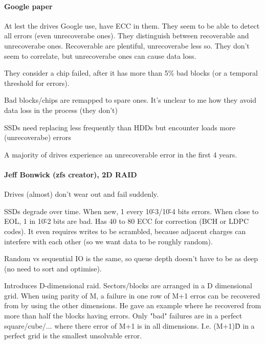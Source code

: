 \documentclass[a4paper]{report}
\begin{document}
        \paragraph{Google paper}
        At lest the drives Google use, have ECC in them. They seem to be able
        to detect all errors (even unrecoverabe ones). They distinguish between
        recoverable and unrecoverabe ones. Recoverable are plentiful,
        unrecoverabe less so. They don't seem to correlate, but unrecoverabe
        ones can cause data loss.

        They consider a chip failed, after it has more than 5\% bad blocks (or
        a temporal threshold for errors).

        Bad blocks/chips are remapped to spare ones. It's unclear to me how
        they avoid data loss in the process (they don't)

        SSDs need replacing less frequently than HDDs but encounter loads more
        (unrecoverabe) errors

        A majority of drives experience an unrecoverable error in the first 4
        years.

        \paragraph{Jeff Bonwick (zfs creator), 2D RAID}
        Drives (almost) don't wear out and fail suddenly.

        SSDs degrade over time. When new, 1 every 10\^-3/10\^-4 bits errors. When
        close to EOL, 1 in 10\^-2 bits are bad. Has 40 to 80 ECC for correction
        (BCH or LDPC codes). It even requires writes to be scrambled, because
        adjacent charges can interfere with each other (so we want data to be
        roughly random).

        Random vs sequential IO is the same, so queue depth doesn't have to be
        as deep (no need to sort and optimise).

        Introduces D-dimensional raid. Sectors/blocks are arranged in a D
        dimensional grid. When using parity of M, a failure in one row of M+1
        erros can be recovered from by using the other dimensions. He gave an
        example where he recovered from more than half the blocks having
        errors. Only "bad" failures are in a perfect square/cube/... where
        there error of M+1 is in all dimensions. I.e. (M+1)\^D in a perfect grid
        is the smallest unsolvable error.
\end{document}
